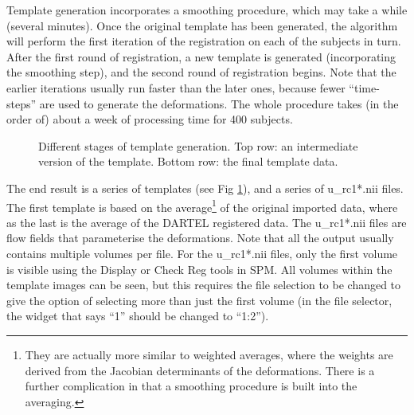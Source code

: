 Template generation incorporates a smoothing procedure, which may take a while (several minutes).
Once the original template has been generated, the algorithm will perform the first iteration of the registration on each of the subjects in turn.
After the first round of registration, a new template is generated (incorporating the smoothing step), and the second round of registration begins.
Note that the earlier iterations usually run faster than the later ones, because fewer ``time-steps'' are used to generate the deformations.
The whole procedure takes (in the order of) about a week of processing time for 400 subjects.

\begin{figure}
\begin{center}
\end{center}
\caption{
Different stages of template generation.
Top row: an intermediate version of the template.
Bottom row: the final template data.
\label{Fig:sharpening}}
\end{figure}

The end result is a series of templates (see Fig \ref{Fig:sharpening}), and a series of u\_rc1*.nii files.
The first template is based on the average\footnote{They are actually more similar to weighted averages, where the weights are derived from the Jacobian determinants of the deformations. There is a further complication in that a smoothing procedure is built into the averaging.} of the original imported data, where as the last is the average of the DARTEL registered data.
The u\_rc1*.nii files are flow fields that parameterise the deformations.
Note that all the output usually contains multiple volumes per file.
For the u\_rc1*.nii files, only the first volume is visible using the Display or Check Reg tools in SPM.
All volumes within the template images can be seen, but this requires the file selection to be changed to give the option of selecting more than just the first volume (in the file selector, the widget that says ``1'' should be changed to ``1:2'').

